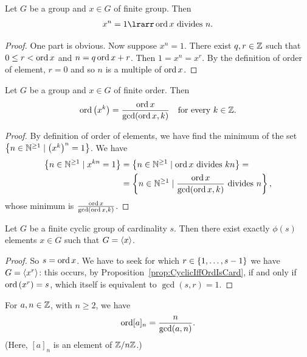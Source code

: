 \begin{proposition}\label{prop:OrdDividesN}
Let \(G\) be a group and \(x \in G\) of finite group. Then
\[x^n = 1 \lrarr \ord x \text{ divides } n.\]
\end{proposition}

\begin{proof}
One part is obvious. Now suppose \(x^n = 1\). There exist \(q, r \in \mathbb Z\) such that \(0 \le r < \operatorname{ord} x\) and \(n = q \operatorname{ord} x +r\). Then \(1 = x^n = x^r\). By the definition of order of element, \(r = 0\) and so \(n\) is a multiple of \(\operatorname{ord} x\).
\end{proof}

\begin{proposition}
Let \(G\) be a group and \(x \in G\) of finite order. Then
\[\operatorname{ord}\left(x^k\right) = \frac{\operatorname{ord} x}{\gcd(\operatorname{ord} x, k)} \quad \text{for every } k \in \mathbb Z.\]
\end{proposition}

\begin{proof} By definition of order of elements, we have find the minimum of the set \(\left\{n \in \mathbb N^{\ge 1} \mid \left(x^k\right)^n = 1\right\}\). We have 
\begin{align*}
\left\{ n \in \mathbb N^{\ge 1} \mid x^{kn} = 1\right\} & = \left\{n \in \mathbb N^{\ge 1} \mid \operatorname{ord} x \text{ divides } kn\right\} = \\
& = \left\{n \in \mathbb N^{\ge 1} \mid \frac{\operatorname{ord} x}{\gcd(\operatorname{ord} x, k)} \text{ divides } n\right\},
\end{align*}
whose minimum is \(\frac{\operatorname{ord} x}{\gcd(\operatorname{ord} x, k)}\).
\end{proof}

\begin{corollary}
Let \(G\) be a finite cyclic group of cardinality \(s\). Then there exist exactly \(\phi(s)\) elements \(x \in G\) such that \(G = \left\langle x\right\rangle\).
\end{corollary}

\begin{proof}
So \(s = \operatorname{ord} x\). We have to seek for which \(r \in \left\{1, \dots{}, s-1\right\}\) we have \(G = \left\langle x^r\right\rangle\): this occurs, by Proposition~\ref{prop:CyclicIffOrdIsCard}, if and only if \(\operatorname{ord} \left(x^r\right) = s\), which itself is equivalent to \(\gcd(s, r) = 1\).
\end{proof}

\begin{corollary}
For \(a, n \in \mathbb Z\), with \(n \ge 2\), we have
\[\operatorname{ord} [a]_n = \frac{n}{\gcd(a, n)}.\]
(Here, \([a]_n\) is an element of \(\mathbb Z/n\mathbb Z\).)
\end{corollary}

